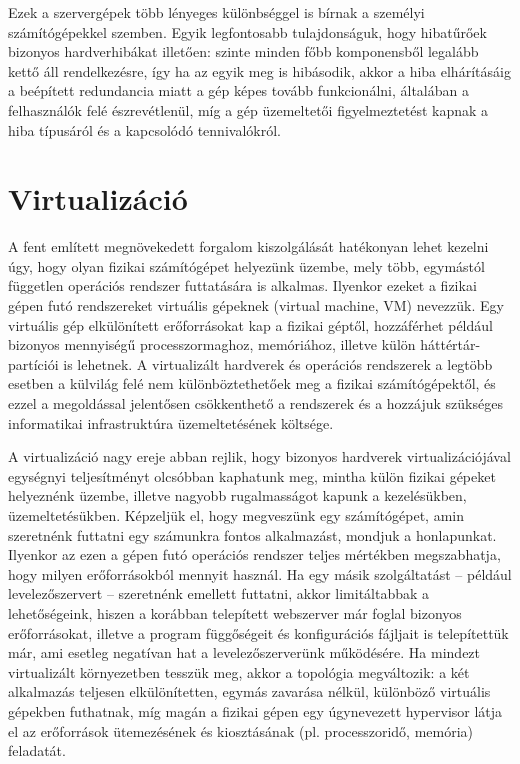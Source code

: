 Ezek a szervergépek több lényeges különbséggel is bírnak a személyi számítógépekkel szemben. Egyik legfontosabb tulajdonságuk, hogy hibatűrőek bizonyos hardverhibákat illetően: szinte minden főbb komponensből legalább kettő áll rendelkezésre, így ha az egyik meg is hibásodik, akkor a hiba elhárításáig a beépített redundancia miatt a gép képes tovább funkcionálni, általában a felhasználók felé észrevétlenül, míg a gép üzemeltetői figyelmeztetést kapnak a hiba típusáról és a kapcsolódó tennivalókról.

\section{Virtualizáció}
A fent említett megnövekedett forgalom kiszolgálását hatékonyan lehet kezelni úgy, hogy olyan fizikai számítógépet helyezünk üzembe, mely  több, egymástól független operációs rendszer futtatására is alkalmas. Ilyenkor ezeket a fizikai gépen futó rendszereket virtuális gépeknek (virtual machine, VM) %
nevezzük. Egy virtuális gép elkülönített erőforrásokat kap a fizikai géptől, hozzáférhet például bizonyos mennyiségű processzormaghoz, memóriához, illetve külön háttértár-partíciói is lehetnek. A virtualizált hardverek és operációs rendszerek a legtöbb esetben a külvilág felé nem különböztethetőek meg a fizikai számítógépektől, és ezzel a megoldással jelentősen csökkenthető a rendszerek és a hozzájuk szükséges informatikai infrastruktúra üzemeltetésének költsége.

A virtualizáció nagy ereje abban rejlik, hogy bizonyos hardverek virtualizációjával egységnyi teljesítményt olcsóbban kaphatunk meg, mintha külön fizikai gépeket helyeznénk üzembe, illetve nagyobb rugalmasságot kapunk a kezelésükben, üzemeltetésükben. Képzeljük el, hogy megveszünk egy számítógépet, amin szeretnénk futtatni egy számunkra fontos alkalmazást, mondjuk a honlapunkat. Ilyenkor az ezen a gépen futó operációs rendszer teljes mértékben megszabhatja, hogy milyen erőforrásokból mennyit használ. Ha egy másik szolgáltatást -- például levelezőszervert -- szeretnénk emellett futtatni, akkor limitáltabbak a lehetőségeink, hiszen a korábban telepített webszerver már foglal bizonyos erőforrásokat, illetve a program függőségeit és konfigurációs fájljait is telepítettük már, ami esetleg negatívan hat a levelezőszerverünk működésére. Ha mindezt virtualizált környezetben tesszük meg, akkor a topológia megváltozik: a két alkalmazás teljesen elkülönítetten, egymás zavarása nélkül, különböző virtuális gépekben futhatnak, míg magán a fizikai gépen egy úgynevezett hypervisor látja el az erőforrások ütemezésének és kiosztásának (pl. processzoridő, memória) feladatát.

